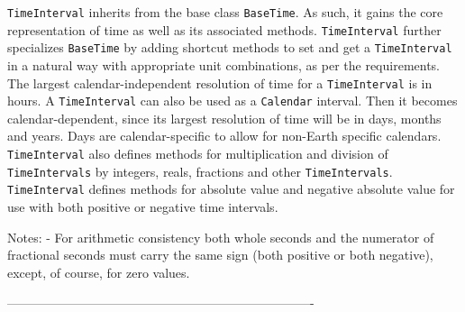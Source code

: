      {\tt TimeInterval} inherits from the base class {\tt BaseTime}.  As such,
     it gains the core representation of time as well as its associated methods.
     {\tt TimeInterval} further specializes {\tt BaseTime} by adding shortcut
     methods to set and get a {\tt TimeInterval} in a natural way with 
     appropriate unit combinations, as per the requirements.  The largest
     calendar-independent resolution of time for a {\tt TimeInterval} is in
     hours.  A {\tt TimeInterval} can also be used as a {\tt Calendar} interval.
     Then it becomes calendar-dependent, since its largest resolution of time
     will be in days, months and years.  Days are calendar-specific to allow
     for non-Earth specific calendars.  {\tt TimeInterval} also defines methods
     for multiplication and division of {\tt TimeIntervals} by integers, reals,
     fractions and other {\tt TimeIntervals}.  {\tt TimeInterval} defines
     methods for absolute value and negative absolute value for use with both
     positive or negative time intervals. 
  
     Notes:
         - For arithmetic consistency both whole seconds and the numerator of
           fractional seconds must carry the same sign (both positive or both 
           negative), except, of course, for zero values.
  
  -------------------------------------------------------------------------
 
